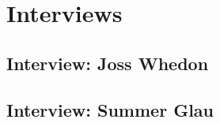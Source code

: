 \documentclass[11pt]{report}
\begin{document}

{}



\appendix

\chapter{Interviews}

\section{Interview: Joss Whedon}

\section{Interview: Summer Glau}
\end{document}
